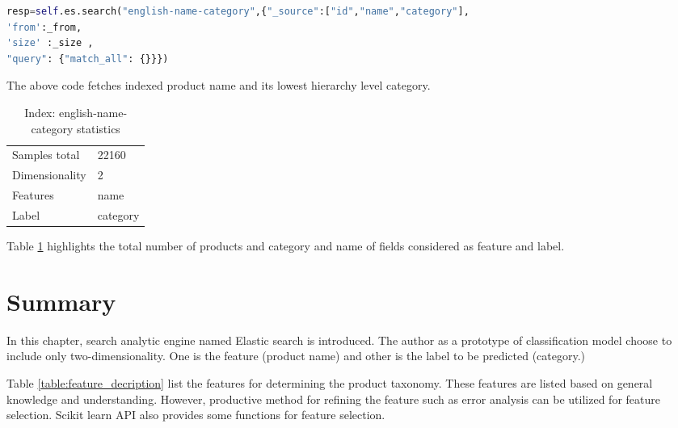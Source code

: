 \begin{lstlisting}[language=Python]
resp=self.es.search("english-name-category",{"_source":["id","name","category"],
'from':_from,
'size' :_size ,
"query": {"match_all": {}}})
\end{lstlisting}

The above code fetches indexed product name and its lowest hierarchy level category.  
\begin{table}[h]
      \caption{Index: english-name-category statistics}
      \centering
      \label{table:enc}
\begin{tabular}{ll}
      \toprule 

      Samples total&22160 \\
      Dimensionality&2 \\
      Features&name \\
      Label&category \\
      
      \bottomrule
\end{tabular}
\end{table}

Table \ref{table:enc} highlights the total number of products and category and name of fields considered as feature and label. 


\section{Summary}

In this chapter, search analytic engine named Elastic search is introduced. The author as a prototype of classification model choose to include only two-dimensionality. One is the feature (product name) and other is the label to be predicted (category.)

Table \ref{table:feature_decription} list the features for determining the product taxonomy. These features are listed based on general knowledge and understanding. However, productive method for refining the feature such as error analysis can be utilized for feature selection. Scikit learn API \parencite{sklearn_api} also provides some functions for feature selection.
